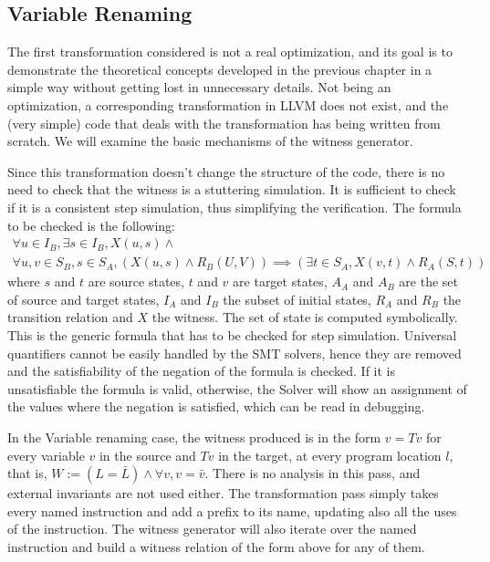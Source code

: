 \subsection{Variable Renaming}
\label{sub:variable_renaming}

The first transformation considered is not a real optimization, and its goal is to demonstrate the theoretical concepts developed in the previous chapter in a simple way without getting lost in unnecessary details. Not being an optimization, a corresponding transformation in LLVM does not exist, and the (very simple) code that deals with the transformation has being written from scratch. We will examine the basic mechanisms of the witness generator.

Since this transformation doesn't change the structure of the code, there is no need to check that the witness is a stuttering simulation. It is sufficient to check if it is a consistent step simulation, thus simplifying the verification. The formula to be checked is the following:
\[
\begin{array}{l}
  \forall u \in I_B, \exists s \in I_B, X(u,s) \land \\
  \forall u,v \in S_B, s \in S_A, (X(u,s) \land R_B(U,V)) \implies (\exists t \in S_A, X(v,t) \land R_A(S,t))
\end{array}
\]
where $s$ and $t$ are source states, $t$ and $v$ are target states, $A_A$ and $A_B$ are the set of source and target states, $I_A$ and $I_B$ the subset of initial states, $R_A$ and $R_B$ the transition relation and $X$ the witness. The set of state is computed symbolically. This is the generic formula that has to be checked for step simulation. Universal quantifiers cannot be easily handled by the SMT solvers, hence they are removed and the satisfiability of the negation of the formula is checked. If it is unsatisfiable the formula is valid, otherwise, the Solver will show an assignment of the values where the negation is satisfied, which can be read in debugging.

In the Variable renaming case, the witness produced is in the form $v=Tv$ for every variable $v$ in the source and $Tv$ in the target, at every program location $l$, that is, $W := (L = \bar{L}) \land \forall v, v = \bar{v}$. There is no analysis in this pass, and external invariants are not used either. The transformation pass simply takes every named instruction and add a prefix to its name, updating also all the uses of the instruction. The witness generator will also iterate over the named instruction and build a witness relation of the form above for any of them.

